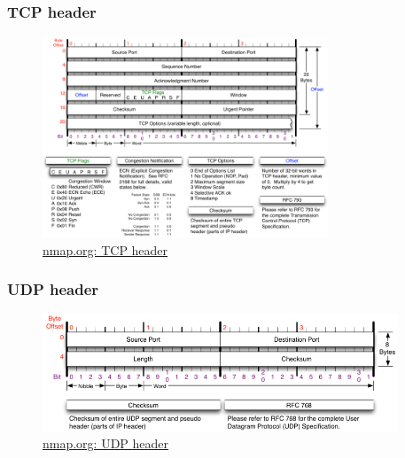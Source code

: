     \begin{frame}
      \frametitle{TCP header}
      \begin{figure}[p]
          \centering
          \includegraphics[height=6cm]{./imgs/tcp-hdr.png}
          \caption{\color{blue}\href{http://nmap.org/book/tcpip-ref.html}{nmap.org: TCP header}}
        \label{fig:tcp-header}
      \end{figure}
    \end{frame}

    \begin{frame}
      \frametitle{UDP header}
      \begin{figure}[p]
          \centering
          \includegraphics[height=3.5cm]{./imgs/udp-hdr.png}
          \caption{\color{blue}\href{http://nmap.org/book/tcpip-ref.html}{nmap.org: UDP header}}
        \label{fig:udp-header}
      \end{figure}
    \end{frame}


